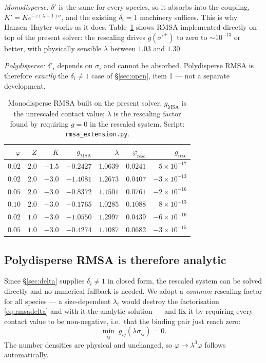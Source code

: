 \documentclass[11pt,a4paper]{article}
\newcommand{\code}[1]{\texttt{#1}}
\begin{document}
\emph{Monodisperse:} $\delta'$ is the same for every species, so it absorbs into
the coupling, $K'=Ke^{-z(\lambda-1)\sigma}$, and the existing $\delta_i=1$
machinery suffices. This is why Hansen--Hayter works as it does.
Table~\ref{tab:rmsa} shows RMSA implemented directly on top of the present
solver: the rescaling drives $g(\sigma'^+)$ to zero to $\sim10^{-13}$ or
better, with physically sensible $\lambda$ between $1.03$ and $1.30$.

\emph{Polydisperse:} $\delta'_i$ depends on $\sigma_i$ and cannot be absorbed.
Polydisperse RMSA is therefore \emph{exactly} the $\delta_i\neq1$ case of
\S\ref{sec:open}, item 1 --- not a separate development.

\begin{table}[htbp]
\centering\small
\caption{Monodisperse RMSA built on the present solver. $g_{\mathrm{MSA}}$ is
the unrescaled contact value; $\lambda$ is the rescaling factor found by
requiring $g=0$ in the rescaled system. Script: \code{rmsa\_extension.py}.}
\label{tab:rmsa}
\begin{tabular}{@{}rrrrrrr@{}}
\toprule
$\varphi$ & $Z$ & $K$ & $g_{\mathrm{MSA}}$ & $\lambda$ & $\varphi_{\mathrm{resc}}$ & $g_{\mathrm{resc}}$\\
\midrule
$0.02$ & $2.0$ & $-1.5$ & $-0.2427$ & $1.0639$ & $0.0241$ & $5\times10^{-17}$\\
$0.02$ & $2.0$ & $-3.0$ & $-1.4081$ & $1.2673$ & $0.0407$ & $-3\times10^{-13}$\\
$0.05$ & $2.0$ & $-3.0$ & $-0.8372$ & $1.1501$ & $0.0761$ & $-2\times10^{-16}$\\
$0.10$ & $2.0$ & $-3.0$ & $-0.1765$ & $1.0285$ & $0.1088$ & $8\times10^{-13}$\\
$0.02$ & $1.0$ & $-3.0$ & $-1.0550$ & $1.2997$ & $0.0439$ & $-6\times10^{-16}$\\
$0.05$ & $1.0$ & $-3.0$ & $-0.4274$ & $1.1087$ & $0.0682$ & $-3\times10^{-15}$\\
\bottomrule
\end{tabular}
\end{table}

\subsection{Polydisperse RMSA is therefore analytic}

Since \S\ref{sec:delta} supplies $\delta_i\neq1$ in closed form, the rescaled
system can be solved directly and no numerical fallback is needed. We adopt a
\emph{common} rescaling factor for all species --- a size-dependent
$\lambda_i$ would destroy the factorisation \eqref{eq:rmsadelta} and with it
the analytic solution --- and fix it by requiring every contact value to be
non-negative, i.e.\ that the binding pair just reach zero:
\begin{equation}
  \min_{ij}\;g_{ij}(\lambda\sigma_{ij})=0 .
  \label{eq:rmsacond}
\end{equation}
The number densities are physical and unchanged, so
$\varphi\to\lambda^3\varphi$ follows automatically.
\end{document}
